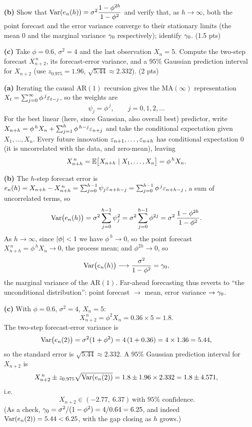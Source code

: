\documentclass[11pt]{article}
\begin{document}
\textbf{(b)} Show that $\operatorname{Var}(e_n(h))=\sigma^2\dfrac{1-\phi^{2h}}{1-\phi^2}$ and verify that, as $h\to\infty$, both the point forecast and the error variance converge to their stationary limits (the mean $0$ and the marginal variance $\gamma_0$ respectively); identify $\gamma_0$. \hfill(1.5 pts)

\textbf{(c)} Take $\phi=0.6$, $\sigma^2=4$ and the last observation $X_n=5$. Compute the two-step forecast $X^{\,n}_{n+2}$, its forecast-error variance, and a $95\%$ Gaussian prediction interval for $X_{n+2}$ (use $z_{0.975}=1.96$, $\sqrt{5.44}\approx2.332$). \hfill(2 pts)
\statementend

\textbf{(a)} Iterating the causal AR$(1)$ recursion gives the $\mathrm{MA}(\infty)$ representation $X_t=\sum_{j=0}^\infty\phi^{\,j}\varepsilon_{t-j}$, so the weights are
\[
\psi_j=\phi^{\,j},\qquad j=0,1,2,\dots
\]
For the best linear (here, since Gaussian, also overall best) predictor, write $X_{n+h}=\phi^{\,h}X_n+\sum_{j=1}^{h}\phi^{\,h-j}\varepsilon_{n+j}$ and take the conditional expectation given $X_1,\dots,X_n$. Every future innovation $\varepsilon_{n+1},\dots,\varepsilon_{n+h}$ has conditional expectation $0$ (it is uncorrelated with the data, and zero-mean), leaving
\[
X^{\,n}_{n+h}=\mathbb{E}\bigl[X_{n+h}\mid X_1,\dots,X_n\bigr]=\phi^{\,h}X_n .
\]

\textbf{(b)} The $h$-step forecast error is $e_n(h)=X_{n+h}-X^{\,n}_{n+h}=\sum_{j=0}^{h-1}\psi_j\varepsilon_{n+h-j}=\sum_{j=0}^{h-1}\phi^{\,j}\varepsilon_{n+h-j}$, a sum of uncorrelated terms, so
\[
\operatorname{Var}\bigl(e_n(h)\bigr)=\sigma^2\sum_{j=0}^{h-1}\psi_j^2
=\sigma^2\sum_{j=0}^{h-1}\phi^{2j}
=\sigma^2\,\frac{1-\phi^{2h}}{1-\phi^2}.
\]
As $h\to\infty$, since $\left\lvert \phi \right\rvert<1$ we have $\phi^{\,h}\to0$, so the point forecast $X^{\,n}_{n+h}=\phi^{\,h}X_n\to0$, the process mean; and $\phi^{2h}\to0$, so
\[
\operatorname{Var}\bigl(e_n(h)\bigr)\longrightarrow\frac{\sigma^2}{1-\phi^2}=\gamma_0,
\]
the marginal variance of the AR$(1)$. Far-ahead forecasting thus reverts to ``the unconditional distribution'': point forecast $\to$ mean, error variance $\to\gamma_0$.

\textbf{(c)} With $\phi=0.6$, $\sigma^2=4$, $X_n=5$:
\[
X^{\,n}_{n+2}=\phi^2X_n=0.36\times5=1.8 .
\]
The two-step forecast-error variance is
\[
\operatorname{Var}\bigl(e_n(2)\bigr)=\sigma^2(1+\phi^2)=4\,(1+0.36)=4\times1.36=5.44,
\]
so the standard error is $\sqrt{5.44}\approx2.332$. A $95\%$ Gaussian prediction interval for $X_{n+2}$ is
\[
X^{\,n}_{n+2}\pm z_{0.975}\sqrt{\operatorname{Var}(e_n(2))}
=1.8\pm1.96\times2.332
=1.8\pm4.571,
\]
i.e.\
\[
\boxed{\,X_{n+2}\in(-2.77,\ 6.37)\ \text{with }95\%\text{ confidence}.}
\]
(As a check, $\gamma_0=\sigma^2/(1-\phi^2)=4/0.64=6.25$, and indeed $\operatorname{Var}(e_n(2))=5.44<6.25$, with the gap closing as $h$ grows.)
\end{document}
